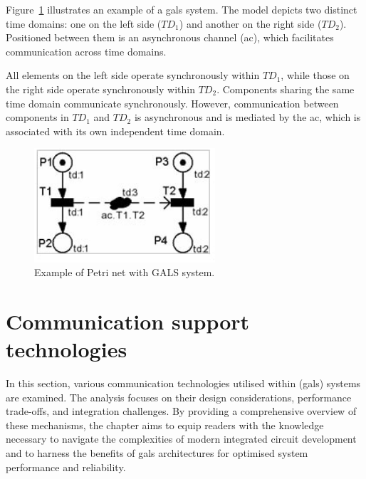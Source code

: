 Figure~\ref{fig:petrigals} illustrates an example of a \gls{gals} system. The model depicts two distinct time domains: one on the left side (\( TD_1 \)) and another on the right side (\( TD_2 \)). Positioned between them is an asynchronous channel (\gls{ac}), which facilitates communication across time domains. 

All elements on the left side operate synchronously within \( TD_1 \), while those on the right side operate synchronously within \( TD_2 \). Components sharing the same time domain communicate synchronously. However, communication between components in \( TD_1 \) and \( TD_2 \) is asynchronous and is mediated by the \gls{ac}, which is associated with its own independent time domain.




\begin{figure}[htbp]
  \centering
  \includegraphics[width=0.6\textwidth]{Chapters/Figures/petrigals.jpg}
  \caption{Example of Petri net with GALS system.}
  \label{fig:petrigals}
\end{figure}


%
%
%
%
%

\section{Communication support technologies}
\label{sec:communication_support_technologies}

In this section, various communication technologies utilised within (\gls{gals}) systems are examined. The analysis focuses on their design considerations, performance trade-offs, and integration challenges. By providing a comprehensive overview of these mechanisms, the chapter aims to equip readers with the knowledge necessary to navigate the complexities of modern integrated circuit development and to harness the benefits of \gls{gals} architectures for optimised system performance and reliability.


